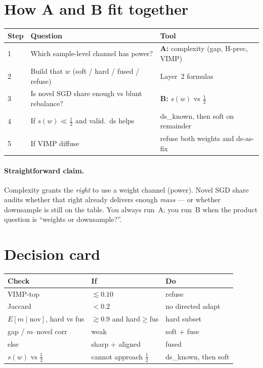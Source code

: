 \documentclass[11pt]{article}
\begin{document}
\section{How A and B fit together}

\begin{center}
\small
\begin{tabular}{@{}lll@{}}
\toprule
Step & Question & Tool \\
\midrule
1 & Which sample-level channel has power?
  & \textbf{A:} complexity (gap, H-prec, VIMP) \\
2 & Build that $w$ (soft / hard / fused / refuse)
  & Layer~2 formulas \\
3 & Is novel SGD share enough vs blunt rebalance?
  & \textbf{B:} $s(w)$ vs $\tfrac12$ \\
4 & If $s(w)\ll\tfrac12$ and valid.\ ds helps
  & ds\_known, then soft on remainder \\
5 & If VIMP diffuse
  & refuse both weights and ds-as-fix \\
\bottomrule
\end{tabular}
\end{center}

\paragraph{Straightforward claim.}
Complexity grants the \emph{right} to use a weight channel (power).
Novel SGD share audits whether that right already delivers enough
\emph{mass} --- or whether downsample is still on the table.
You always run~A; you run~B when the product question is ``weights or
downsample?''.

\section{Decision card}

\begin{center}
\small
\begin{tabular}{@{}lll@{}}
\toprule
Check & If & Do \\
\midrule
VIMP-top & $\lesssim 0.10$ & refuse \\
Jaccard & $<0.2$ & no directed adapt \\
$E[m\mid\mathrm{nov}]$, hard vs fus
  & $\gtrsim 0.9$ and hard$\ge$fus & hard subset \\
gap / $m$--novel corr & weak & soft $+$ fuse \\
else & sharp $+$ aligned & fused \\
$s(w)$ vs $\tfrac12$ & cannot approach $\tfrac12$ & ds\_known, then soft \\
\bottomrule
\end{tabular}
\end{center}
\end{document}
